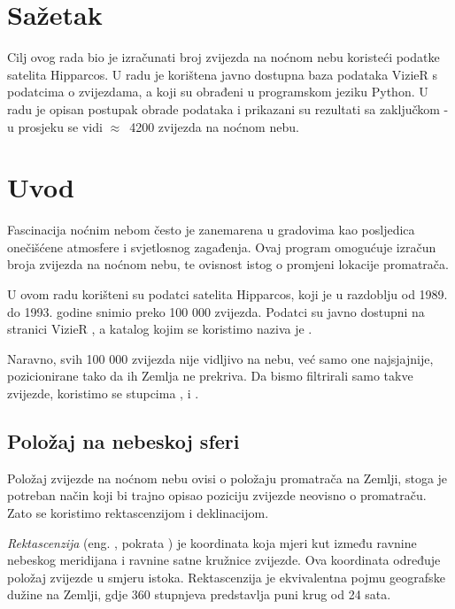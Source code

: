 


\maketitlepage

\section*{Sažetak}
Cilj ovog rada bio je izračunati broj zvijezda na noćnom nebu koristeći podatke satelita Hipparcos. U radu je korištena javno dostupna baza podataka VizieR \cite{ct:VizieR} s podatcima o zvijezdama, a koji su obrađeni u programskom jeziku Python. U radu je opisan postupak obrade podataka i prikazani su rezultati sa zaključkom - u prosjeku se vidi \mbox{$\approx$ 4200} zvijezda na noćnom nebu.

\section{Uvod}
Fascinacija noćnim nebom često je zanemarena u gradovima kao posljedica onečišćene atmosfere i svjetlosnog zagađenja. Ovaj program omogućuje izračun broja zvijezda na noćnom nebu, te ovisnost istog o promjeni lokacije promatrača.
\par
U ovom radu korišteni su podatci satelita Hipparcos, koji je u razdoblju od 1989. do 1993. godine snimio preko 100 000 zvijezda. Podatci su javno dostupni na stranici \mbox{VizieR} \cite{ct:VizieR}, a katalog kojim se koristimo naziva je .

Naravno, svih 100 000 zvijezda nije vidljivo na nebu, već samo one najsjajnije, pozicionirane tako da ih Zemlja ne prekriva. Da bismo filtrirali samo takve zvijezde, koristimo se stupcima ,  i .

\subsection{Položaj na nebeskoj sferi}
Položaj zvijezde na noćnom nebu ovisi o položaju promatrača na Zemlji, stoga je potreban način koji bi trajno opisao poziciju zvijezde neovisno o promatraču. Zato se koristimo rektascenzijom i deklinacijom. \cite{ct:equatorial_coords}

\emph{Rektascenzija} (eng. , pokrata ) je koordinata koja mjeri kut između ravnine nebeskog meridijana i ravnine satne kružnice zvijezde. Ova koordinata određuje položaj zvijezde u smjeru istoka. Rektascenzija je ekvivalentna pojmu geografske dužine na Zemlji, gdje 360 stupnjeva predstavlja puni krug od 24 sata.

